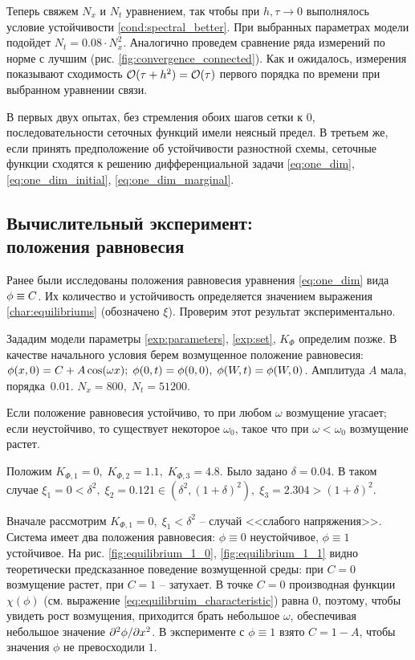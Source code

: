 Теперь свяжем $N_x$ и $N_t$ уравнением, так чтобы при $h, \tau \to 0$ выполнялось условие устойчивости \eqref{cond:spectral_better}. При выбранных параметрах модели подойдет $N_t = 0.08 \cdot N_x^2$. Аналогично проведем сравнение ряда измерений по норме с лучшим (рис. \ref{fig:convergence_connected}). Как и ожидалось, измерения показывают сходимость ${\mathcal{O}} (\tau + h^2) = {\mathcal{O}} (\tau)$ первого порядка по времени при выбранном уравнении связи.

В первых двух опытах, без стремления обоих шагов сетки к $0$, последовательности сеточных функций имели неясный предел. В третьем же, если принять предположение об устойчивости разностной схемы, сеточные функции сходятся к решению дифференциальной задачи \eqref{eq:one_dim}, \eqref{eq:one_dim_initial}, \eqref{eq:one_dim_marginal}.


\subsection{Вычислительный эксперимент: \\ положения равновесия}

Ранее были исследованы положения равновесия уравнения \eqref{eq:one_dim} вида $\phi \hm \equiv C$. Их количество и устойчивость определяется значением выражения \eqref{char:equilibriums} (обозначено $\xi$). Проверим этот результат экспериментально.

Зададим модели параметры \eqref{exp:parameters}, \eqref{exp:set}, $K_\Phi$ определим позже. В качестве начального условия берем возмущенное положение равновесия: $\phi(x, 0) = C \hm + A \cos(\omega x); \; \phi(0, t) = \phi(0, 0), \; \phi(W, t) = \phi(W, 0)$. Амплитуда $A$ мала, порядка~$0.01$. $N_x = 800, \; N_t = 51200$.

Если положение равновесия устойчиво, то при любом $\omega$ возмущение угасает; если неустойчиво, то существует некоторое $\omega_0$, такое что при $\omega < \omega_0$ возмущение растет.

Положим $K_{\Phi, 1} = 0, \; K_{\Phi, 2} = 1.1, \; K_{\Phi, 3} = 4.8$. Было задано $\delta = 0.04$. В таком случае $\xi_1 = 0 < \delta^2, \; \xi_2 = 0.121 \in (\delta^2, (1 + \delta)^2), \; \xi_3 = 2.304 > (1 + \delta)^2$.

Вначале рассмотрим $K_{\Phi, 1} = 0, \; \xi_1 < \delta^2$ -- случай <<слабого напряжения>>. Система имеет два положения равновесия: $\phi \equiv 0$ неустойчивое, $\phi \equiv 1$ устойчивое. На рис. \ref{fig:equilibrium_1_0}, \ref{fig:equilibrium_1_1} видно теоретически предсказанное поведение возмущенной среды: при $C = 0$ возмущение растет, при $C = 1$ -- затухает. В точке $C = 0$ производная функции $\chi(\phi)$ (см. выражение \eqref{eq:equilibruim_characteristic}) равна $0$, поэтому, чтобы увидеть рост возмущения, приходится брать небольшое $\omega$, обеспечивая небольшое значение $\partial^2 \phi / \partial x^2$. В эксперименте с $\phi \equiv 1$ взято $C = 1 - A$, чтобы значения $\phi$ не превосходили $1$.

